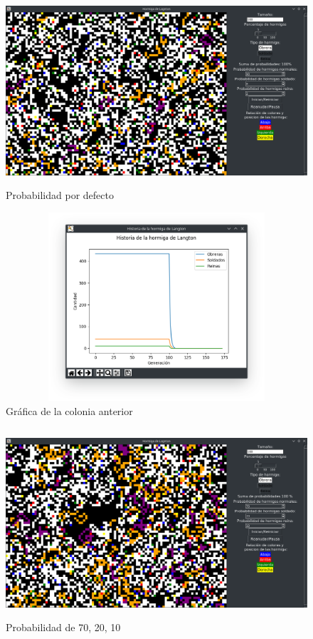 \begin{figure}[H]
\begin{center}
 \includegraphics[width=12cm, height=7cm]{img/modificado1.png}
 \caption{Probabilidad por defecto}
 \label{fig:modificado1}
\end{center}
\end{figure}

\begin{figure}[H]
\begin{center}
 \includegraphics[width=12cm, height=7cm]{img/modificado1grafica.png}
 \caption{Gráfica de la colonia anterior}
 \label{fig:modificado1grafica}
\end{center}
\end{figure}
\begin{figure}[H]
\begin{center}
 \includegraphics[width=12cm, height=7cm]{img/modificado2.png}
 \caption{Probabilidad de 70, 20, 10}
 \label{fig:modificado2}
\end{center}
\end{figure}

